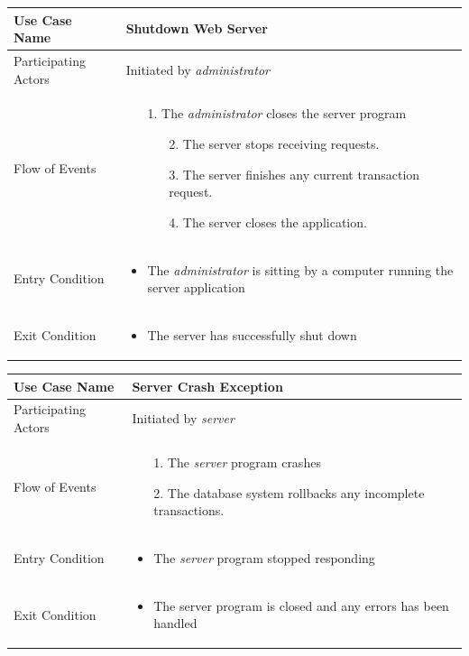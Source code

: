\begin{center}
	\begin{tabular}{ | l | p{10cm} |  }
		 \hline
		Use Case Name & Shutdown Web Server \\ \hline
		Participating Actors & Initiated by \emph{administrator} \\ \hline
		Flow of Events & \begin{enumerate}
						\item[1.] The \emph{administrator} closes the server program
						\begin{enumerate}
							\item[2.] The server stops receiving requests.
							\item[3.] The server finishes any current transaction request.
							\item[4.] The server closes the application.			 
						\end{enumerate}
					\end{enumerate} \\ \hline
		Entry Condition & \begin{itemize}
						\item The \emph{administrator} is sitting by a computer running the server application
					\end{itemize} \\ \hline
		Exit Condition & \begin{itemize}
						\item The server has successfully shut down
					\end{itemize} \\
		\hline
	\end{tabular}
\end{center}

\begin{center}
	\begin{tabular}{ | l | p{10cm} |  }
		 \hline
		Use Case Name & Server Crash Exception \\ \hline
		Participating Actors & Initiated by \emph{server} \\ \hline
		Flow of Events & \begin{enumerate}
						\item[1.] The \emph{server} program crashes
						\item[2.] The database system rollbacks any incomplete transactions.
						\end{enumerate} \\ \hline
		Entry Condition & \begin{itemize}
						\item The \emph{server} program stopped responding
					\end{itemize} \\ \hline
		Exit Condition & \begin{itemize}
						\item The server program is closed and any errors has been handled
					\end{itemize} \\
		\hline
	\end{tabular}
\end{center}

